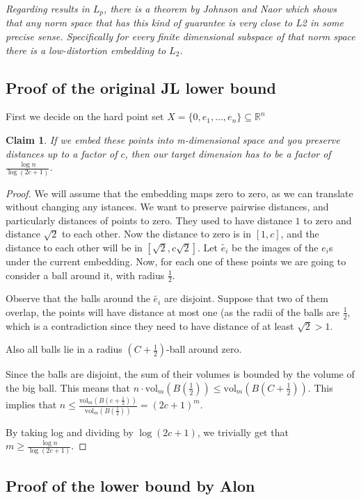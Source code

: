 \documentclass[11pt]{article}
\newcommand{\R}{\mathbb{R}}
\newcommand{\vol}{\text{vol}}
\newtheorem{claim}[theorem]{Claim}
\begin{document}
\textit{Regarding results in $L_p$, there is a theorem by Johnson and Naor \cite{JN09} which shows that any norm space that has this kind of guarantee is very close to L2 in some precise sense. Specifically for every finite dimensional subspace of that norm space there is a low-distortion embedding to $L_2$.}

\subsection{Proof of the original JL lower bound \cite{JL84}}
First we decide on the hard point set $X=\{0, e_1, \ldots, e_n\} \subseteq \R^n$

\begin{claim}
  If we embed these points into m-dimensional space and you preserve distances up to a factor of $c$, then our target dimension has to be a factor of $\frac{\log n}{\log(2c+1)}$.
\end{claim}
\begin{proof}
  We will assume that the embedding maps zero to zero, as we can translate without changing any istances. We want to preserve pairwise distances, and particularly distances of points to zero. They used to have distance $1$ to zero and distance $\sqrt{2}$ to each other. Now the distance to zero is in $[1, c]$, and the distance to each other will be in $[\sqrt{2}, c\sqrt{2}]$. Let $\widetilde{e_i}$ be the images of the $e_i$s under the current embedding. Now, for each one of these points we are going to consider a ball around it, with radius $\frac{1}{2}$.

  Observe that the balls around the $\widetilde{e_i}$ are disjoint. Suppose that two of them overlap, the points will have distance at most one (as the radii of the balls are $\frac{1}{2}$, which is a contradiction since they need to have distance of at least $\sqrt{2}>1$.

  Also all balls lie in a radius $(C+\frac{1}{2})$-ball around zero.

  Since the balls are disjoint, the sum of their volumes is bounded by the volume of the big ball. This means that $n\cdot \vol_m(B(\frac{1}{2}))\leq \vol_m(B(C+\frac{1}{2}))$. This implies that $n\leq \frac{\vol_m(B(c+\frac{1}{2}))}{\vol_m(B(\frac{1}{2}))}=(2c+1)^m$.

  By taking log and dividing by $\log(2c+1)$, we trivially get that $m\geq\frac{\log n}{\log(2c+1)}$.
\end{proof}

\subsection{Proof of the lower bound by Alon \cite{ALON03}}
\end{document}
